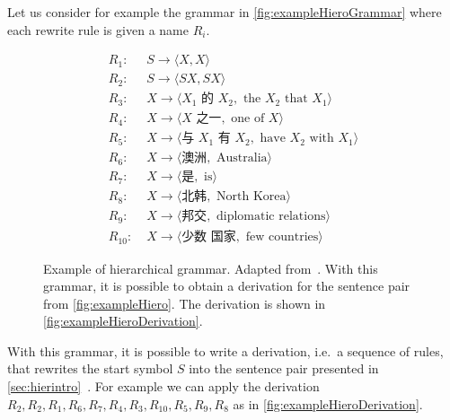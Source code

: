 Let us consider for example the grammar
in \autoref{fig:exampleHieroGrammar} where each rewrite rule is given a name $R_i$.
%
\begin{figure}
\begin{CJK}{UTF8}{gbsn}
  \begin{align}
    R_1:&\; S \rightarrow \langle X, X \rangle \nonumber \\
    R_2:&\; S \rightarrow \langle S X, S X \rangle \nonumber \\
    R_3:&\; X \rightarrow \langle X_1 \mbox{ 的 } X_2, \mbox{ the } X_2 \mbox{ that } X_1 \rangle \nonumber \\
    R_4:&\; X \rightarrow \langle X \mbox{ 之一}, \mbox{ one of } X \rangle \nonumber \\
    R_5:&\; X \rightarrow \langle \mbox{与 } X_1 \mbox{ 有 } X_2, \mbox{ have } X_2 \mbox{ with } X_1 \rangle \nonumber \\
    R_6:&\; X \rightarrow \langle \mbox{澳洲}, \mbox{ Australia} \rangle \nonumber \\
    R_7:&\; X \rightarrow \langle \mbox{是}, \mbox{ is} \rangle \nonumber \\
    R_8:&\; X \rightarrow \langle \mbox{北韩}, \mbox{ North Korea} \rangle \nonumber \\
    R_9:&\; X \rightarrow \langle \mbox{邦交}, \mbox{ diplomatic relations} \rangle \nonumber \\
    R_{10}:&\; X \rightarrow \langle \mbox{少数 国家}, \mbox{ few countries} \rangle \nonumber
  \end{align}
  \caption{Example of hierarchical grammar.
    Adapted from~\citep{chiang:2007:CL}. With this grammar, it
    is possible to obtain a derivation for the sentence pair
    from \autoref{fig:exampleHiero}.
    The derivation is shown in \autoref{fig:exampleHieroDerivation}.}
  \label{fig:exampleHieroGrammar}
\end{CJK}
\end{figure}
%
With this grammar, it is possible to write a derivation, i.e.\ a sequence of rules,
that rewrites the start symbol $S$ into the sentence pair presented in
\autoref{sec:hierintro}~\citep{chiang:2007:CL}.
For example we can apply the derivation $R_2,R_2,R_1,R_6,R_7,R_4,R_3,R_{10},R_5,R_9,R_8$ as
in \autoref{fig:exampleHieroDerivation}.
%
